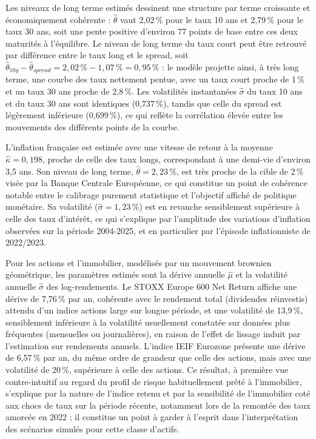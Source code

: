 Les niveaux de long terme estimés dessinent une structure par terme croissante et économiquement cohérente : $\hat{\theta}$ vaut 2{,}02\,\% pour le taux 10 ans et 2{,}79\,\% pour le taux 30 ans, soit une pente positive d'environ 77 points de base entre ces deux maturités à l'équilibre. Le niveau de long terme du taux court peut être retrouvé par différence entre le taux long et le spread, soit $\hat{\theta}_{10y} - \hat{\theta}_{spread} = 2{,}02\,\% - 1{,}07\,\% = 0{,}95\,\%$ : le modèle projette ainsi, à très long terme, une courbe des taux nettement pentue, avec un taux court proche de 1\,\% et un taux 30 ans proche de 2{,}8\,\%. Les volatilités instantanées $\hat{\sigma}$ du taux 10 ans et du taux 30 ans sont identiques (0{,}737\,\%), tandis que celle du spread est légèrement inférieure (0{,}699\,\%), ce qui reflète la corrélation élevée entre les mouvements des différents points de la courbe.

L'inflation française est estimée avec une vitesse de retour à la moyenne $\hat{\kappa} = 0{,}198$, proche de celle des taux longs, correspondant à une demi-vie d'environ 3{,}5 ans. Son niveau de long terme, $\hat{\theta} = 2{,}23\,\%$, est très proche de la cible de 2\,\% visée par la Banque Centrale Européenne, ce qui constitue un point de cohérence notable entre le calibrage purement statistique et l'objectif affiché de politique monétaire. Sa volatilité ($\hat{\sigma} = 1{,}23\,\%$) est en revanche sensiblement supérieure à celle des taux d'intérêt, ce qui s'explique par l'amplitude des variations d'inflation observées sur la période 2004-2025, et en particulier par l'épisode inflationniste de 2022/2023.

Pour les actions et l'immobilier, modélisés par un mouvement brownien géométrique, les paramètres estimés sont la dérive annuelle $\hat{\mu}$ et la volatilité annuelle $\hat{\sigma}$ des log-rendements. Le STOXX Europe 600 Net Return affiche une dérive de 7{,}76\,\% par an, cohérente avec le rendement total (dividendes réinvestis) attendu d'un indice actions large sur longue période, et une volatilité de 13{,}9\,\%, sensiblement inférieure à la volatilité usuellement constatée sur données plus fréquentes (mensuelles ou journalières), en raison de l'effet de lissage induit par l'estimation sur rendements annuels. L'indice IEIF Eurozone présente une dérive de 6{,}57\,\% par an, du même ordre de grandeur que celle des actions, mais avec une volatilité de 20\,\%, supérieure à celle des actions. Ce résultat, à première vue contre-intuitif au regard du profil de risque habituellement prêté à l'immobilier, s'explique par la nature de l'indice retenu et par la sensibilité de l'immobilier coté aux chocs de taux sur la période récente, notamment lors de la remontée des taux amorcée en 2022 ; il constitue un point à garder à l'esprit dans l'interprétation des scénarios simulés pour cette classe d'actifs.

